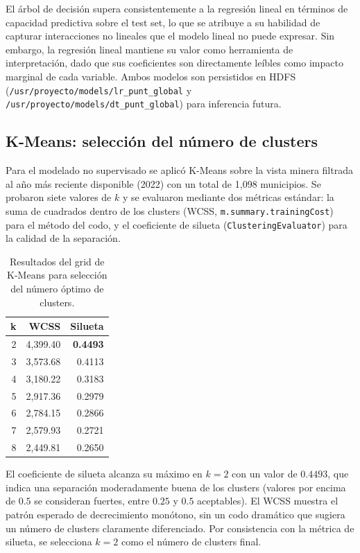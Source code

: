 El árbol de decisión supera consistentemente a la regresión lineal en términos de capacidad predictiva sobre el test set, lo que se atribuye a su habilidad de capturar interacciones no lineales que el modelo lineal no puede expresar. Sin embargo, la regresión lineal mantiene su valor como herramienta de interpretación, dado que sus coeficientes son directamente leíbles como impacto marginal de cada variable. Ambos modelos son persistidos en HDFS (\texttt{/usr/proyecto/models/lr\_punt\_global} y \texttt{/usr/proyecto/models/dt\_punt\_global}) para inferencia futura.

\subsection{K-Means: selección del número de clusters}
Para el modelado no supervisado se aplicó K-Means sobre la vista minera filtrada al año más reciente disponible (2022) con un total de 1,098 municipios. Se probaron siete valores de $k$ y se evaluaron mediante dos métricas estándar: la suma de cuadrados dentro de los clusters (WCSS, \texttt{m.summary.trainingCost}) para el método del codo, y el coeficiente de silueta (\texttt{ClusteringEvaluator}) para la calidad de la separación.

\begin{table}[H]
\centering
\caption{Resultados del grid de K-Means para selección del número óptimo de clusters.}
\begin{tabular}{r r r}
\toprule
\textbf{k} & \textbf{WCSS} & \textbf{Silueta} \\
\midrule
2 & 4,399.40 & \textbf{0.4493} \\
3 & 3,573.68 & 0.4113 \\
4 & 3,180.22 & 0.3183 \\
5 & 2,917.36 & 0.2979 \\
6 & 2,784.15 & 0.2866 \\
7 & 2,579.93 & 0.2721 \\
8 & 2,449.81 & 0.2650 \\
\bottomrule
\end{tabular}
\end{table}

El coeficiente de silueta alcanza su máximo en $k = 2$ con un valor de $0.4493$, que indica una separación moderadamente buena de los clusters (valores por encima de $0.5$ se consideran fuertes, entre $0.25$ y $0.5$ aceptables). El WCSS muestra el patrón esperado de decrecimiento monótono, sin un codo dramático que sugiera un número de clusters claramente diferenciado. Por consistencia con la métrica de silueta, se selecciona $k = 2$ como el número de clusters final.

